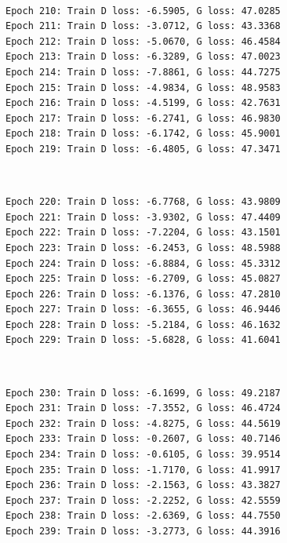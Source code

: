 \documentclass[11pt]{article}
\begin{document}
    \begin{center}
    \end{center}
    { \hspace*{\fill} \\}
    
    \begin{Verbatim}[commandchars=\\\{\}]
Epoch 210: Train D loss: -6.5905, G loss: 47.0285
Epoch 211: Train D loss: -3.0712, G loss: 43.3368
Epoch 212: Train D loss: -5.0670, G loss: 46.4584
Epoch 213: Train D loss: -6.3289, G loss: 47.0023
Epoch 214: Train D loss: -7.8861, G loss: 44.7275
Epoch 215: Train D loss: -4.9834, G loss: 48.9583
Epoch 216: Train D loss: -4.5199, G loss: 42.7631
Epoch 217: Train D loss: -6.2741, G loss: 46.9830
Epoch 218: Train D loss: -6.1742, G loss: 45.9001
Epoch 219: Train D loss: -6.4805, G loss: 47.3471

    \end{Verbatim}

    \begin{center}
    \end{center}
    { \hspace*{\fill} \\}
    
    \begin{Verbatim}[commandchars=\\\{\}]
Epoch 220: Train D loss: -6.7768, G loss: 43.9809
Epoch 221: Train D loss: -3.9302, G loss: 47.4409
Epoch 222: Train D loss: -7.2204, G loss: 43.1501
Epoch 223: Train D loss: -6.2453, G loss: 48.5988
Epoch 224: Train D loss: -6.8884, G loss: 45.3312
Epoch 225: Train D loss: -6.2709, G loss: 45.0827
Epoch 226: Train D loss: -6.1376, G loss: 47.2810
Epoch 227: Train D loss: -6.3655, G loss: 46.9446
Epoch 228: Train D loss: -5.2184, G loss: 46.1632
Epoch 229: Train D loss: -5.6828, G loss: 41.6041

    \end{Verbatim}

    \begin{center}
    \end{center}
    { \hspace*{\fill} \\}
    
    \begin{Verbatim}[commandchars=\\\{\}]
Epoch 230: Train D loss: -6.1699, G loss: 49.2187
Epoch 231: Train D loss: -7.3552, G loss: 46.4724
Epoch 232: Train D loss: -4.8275, G loss: 44.5619
Epoch 233: Train D loss: -0.2607, G loss: 40.7146
Epoch 234: Train D loss: -0.6105, G loss: 39.9514
Epoch 235: Train D loss: -1.7170, G loss: 41.9917
Epoch 236: Train D loss: -2.1563, G loss: 43.3827
Epoch 237: Train D loss: -2.2252, G loss: 42.5559
Epoch 238: Train D loss: -2.6369, G loss: 44.7550
Epoch 239: Train D loss: -3.2773, G loss: 44.3916

    \end{Verbatim}
\end{document}
